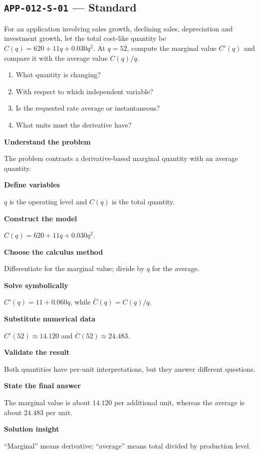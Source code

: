 \documentclass[11pt]{book}
\newcommand{\pid}[1]{\texttt{#1}}
\begin{document}
\subsection*{\pid{APP-012-S-01} — Standard}
\begin{problembox}
For an application involving sales growth, declining sales, depreciation and investment growth, let the total cost-like quantity be $C(q)=620+11q+0.030q^2$. At $q=52$, compute the marginal value $C'(q)$ and compare it with the average value $C(q)/q$.
\end{problembox}
\begin{promptbox}\begin{enumerate}
\item What quantity is changing?
\item With respect to which independent variable?
\item Is the requested rate average or instantaneous?
\item What units must the derivative have?
\end{enumerate}\end{promptbox}
\begin{solutionbox}
\textbf{Understand the problem}\par The problem contrasts a derivative-based marginal quantity with an average quantity.\par\medskip
\textbf{Define variables}\par $q$ is the operating level and $C(q)$ is the total quantity.\par\medskip
\textbf{Construct the model}\par $C(q)=620+11q+0.030q^2$.\par\medskip
\textbf{Choose the calculus method}\par Differentiate for the marginal value; divide by $q$ for the average.\par\medskip
\textbf{Solve symbolically}\par $C'(q)=11+0.060q$, while $\bar C(q)=C(q)/q$.\par\medskip
\textbf{Substitute numerical data}\par $C'(52)\approx 14.120$ and $\bar C(52)\approx 24.483$.\par\medskip
\textbf{Validate the result}\par Both quantities have per-unit interpretations, but they answer different questions.\par\medskip
\textbf{State the final answer}\par The marginal value is about $14.120$ per additional unit, whereas the average is about $24.483$ per unit.\par\medskip
\textbf{Solution insight}\par “Marginal” means derivative; “average” means total divided by production level.\par\medskip
\end{solutionbox}
\end{document}
